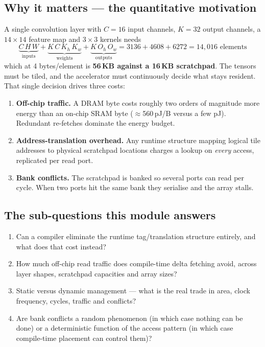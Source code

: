 \documentclass[11pt,a4paper]{article}
\begin{document}
\subsection{Why it matters --- the quantitative motivation}

A single convolution layer with $C{=}16$ input channels, $K{=}32$ output
channels, a $14\times14$ feature map and $3\times3$ kernels needs
\[
  \underbrace{C\,H\,W}_{\text{inputs}} +
  \underbrace{K\,C\,K_h\,K_w}_{\text{weights}} +
  \underbrace{K\,O_h\,O_w}_{\text{outputs}}
  = 3136 + 4608 + 6272 = 14{,}016 \text{ elements}
\]
which at 4 bytes/element is \textbf{56\,KB against a 16\,KB scratchpad}. The
tensors must be tiled, and the accelerator must continuously decide what stays
resident. That single decision drives three costs:

\begin{enumerate}[leftmargin=1.5em,itemsep=3pt]
  \item \textbf{Off-chip traffic.} A DRAM byte costs roughly two orders of
        magnitude more energy than an on-chip SRAM byte ($\approx$560\,pJ/B
        versus a few pJ). Redundant re-fetches dominate the energy budget.
  \item \textbf{Address-translation overhead.} Any runtime structure mapping
        logical tile addresses to physical scratchpad locations charges a
        lookup on \emph{every} access, replicated per read port.
  \item \textbf{Bank conflicts.} The scratchpad is banked so several ports can
        read per cycle. When two ports hit the same bank they serialise and
        the array stalls.
\end{enumerate}

\subsection{The sub-questions this module answers}

\begin{enumerate}[leftmargin=1.5em,itemsep=2pt]
  \item Can a compiler eliminate the runtime tag/translation structure entirely,
        and what does that cost instead?
  \item How much off-chip read traffic does compile-time delta fetching avoid,
        across layer shapes, scratchpad capacities and array sizes?
  \item Static versus dynamic management --- what is the real trade in area,
        clock frequency, cycles, traffic and conflicts?
  \item Are bank conflicts a random phenomenon (in which case nothing can be
        done) or a deterministic function of the access pattern (in which case
        compile-time placement can control them)?
\end{enumerate}
\end{document}
